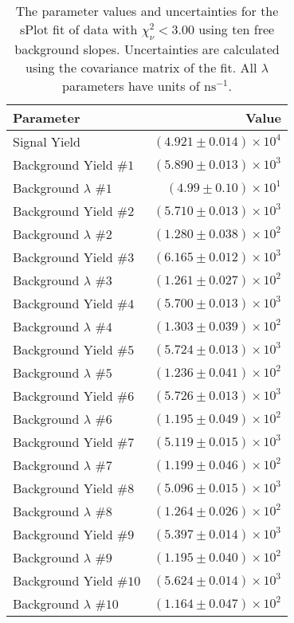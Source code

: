 
\begin{table}[h]
    \begin{center}
        \begin{tabular}{lr}\toprule
            Parameter & Value \\\midrule
            Signal Yield & $(4.921 \pm 0.014) \times 10^{4}$ \\
            Background Yield $\#1$ & $(5.890 \pm 0.013) \times 10^{3}$ \\
            Background $\lambda$ $\#1$ & $(4.99 \pm 0.10) \times 10^{1}$ \\
            Background Yield $\#2$ & $(5.710 \pm 0.013) \times 10^{3}$ \\
            Background $\lambda$ $\#2$ & $(1.280 \pm 0.038) \times 10^{2}$ \\
            Background Yield $\#3$ & $(6.165 \pm 0.012) \times 10^{3}$ \\
            Background $\lambda$ $\#3$ & $(1.261 \pm 0.027) \times 10^{2}$ \\
            Background Yield $\#4$ & $(5.700 \pm 0.013) \times 10^{3}$ \\
            Background $\lambda$ $\#4$ & $(1.303 \pm 0.039) \times 10^{2}$ \\
            Background Yield $\#5$ & $(5.724 \pm 0.013) \times 10^{3}$ \\
            Background $\lambda$ $\#5$ & $(1.236 \pm 0.041) \times 10^{2}$ \\
            Background Yield $\#6$ & $(5.726 \pm 0.013) \times 10^{3}$ \\
            Background $\lambda$ $\#6$ & $(1.195 \pm 0.049) \times 10^{2}$ \\
            Background Yield $\#7$ & $(5.119 \pm 0.015) \times 10^{3}$ \\
            Background $\lambda$ $\#7$ & $(1.199 \pm 0.046) \times 10^{2}$ \\
            Background Yield $\#8$ & $(5.096 \pm 0.015) \times 10^{3}$ \\
            Background $\lambda$ $\#8$ & $(1.264 \pm 0.026) \times 10^{2}$ \\
            Background Yield $\#9$ & $(5.397 \pm 0.014) \times 10^{3}$ \\
            Background $\lambda$ $\#9$ & $(1.195 \pm 0.040) \times 10^{2}$ \\
            Background Yield $\#10$ & $(5.624 \pm 0.014) \times 10^{3}$ \\
            Background $\lambda$ $\#10$ & $(1.164 \pm 0.047) \times 10^{2}$ \\\bottomrule
        \end{tabular}
        \caption{The parameter values and uncertainties for the sPlot fit of data with $\chi^2_\nu < 3.00$ using ten free background slopes. Uncertainties are calculated using the covariance matrix of the fit. All $\lambda$ parameters have units of $\si{\nano\second}^{-1}$.}
    \end{center}
\end{table}
